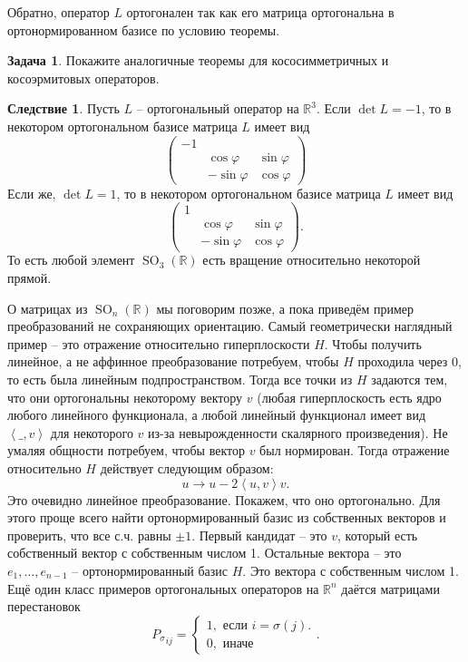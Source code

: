 \documentclass[10pt,a4paper,oneside]{book} %
\theoremstyle{definition}
\newtheorem{zad}{Задача}
\newtheorem{cor}{Следствие}
\newcommand{\mb}[1]{\mathbb{#1}}
\newcommand{\SO}{\operatorname{SO}}
\def\lan{\left\langle }
\def\ran{\right\rangle}
\def\zd{\begin{zad}}
\def\ezd{\end{zad}}
\def\crl{\begin{cor}}
\def\ecrl{\end{cor}}
\begin{document}
Обратно, оператор $L$ ортогонален так как его матрица ортогональна в ортонормированном базисе по условию теоремы. 
\endproof




\zd Покажите аналогичные теоремы для кососимметричных и косоэрмитовых операторов.
\ezd

\crl Пусть $L$ -- ортогональный оператор на $\mb R^3$. Если $\det L=-1$, то в некотором ортогональном базисе матрица $L$ имеет вид 
$$\begin{pmatrix}
- 1 &&\\
&\cos \varphi & \sin \varphi\\
&-\sin \varphi &\cos \varphi
\end{pmatrix}$$
Если же, $\det L=1$, то в некотором ортогональном базисе матрица $L$ имеет вид 
$$\begin{pmatrix}
1 &&\\
&\cos \varphi & \sin \varphi\\
&-\sin \varphi &\cos \varphi
\end{pmatrix}.$$
То есть любой элемент $\SO_3(\mb R)$ есть вращение относительно некоторой прямой. 
\ecrl

О матрицах из $\SO_n(\mb R)$ мы поговорим позже, а пока приведём пример преобразований не сохраняющих ориентацию. Самый геометрически наглядный пример -- это отражение относительно гиперплоскости $H$. Чтобы получить линейное, а не аффинное преобразование потребуем, чтобы $H$ проходила через 0, то есть была линейным подпространством. Тогда все точки из $H$ задаются тем, что они ортогональны некоторому вектору $v$ (любая гиперплоскость есть ядро любого линейного функционала, а любой линейный функционал имеет вид $\lan \_ ,v \ran$ для некоторого $v$ из-за невырожденности скалярного произведения). Не умаляя общности потребуем, чтобы вектор $v$ был нормирован. Тогда отражение относительно $H$ действует следующим образом:
$$u \to u - 2 \lan u,v\ran v.$$
Это очевидно линейное преобразование. Покажем, что оно ортогонально. Для этого проще всего найти ортонормированный базис из собственных векторов и проверить, что все с.ч. равны $\pm 1$. Первый кандидат -- это $v$, который есть собственный вектор с собственным числом 1. Остальные вектора -- это $e_1,\dots, e_{n-1}$ -- ортонормированный базис $H$. Это вектора с собственным числом 1. \\

Ещё один класс примеров ортогональных операторов на $\mb R^n$ даётся матрицами перестановок $${P_{\sigma}}_{ij}=\begin{cases} 1, \text{ если $i=\sigma(j)$}.\\
0, \text{ иначе}
\end{cases}. $$  
\end{document}
